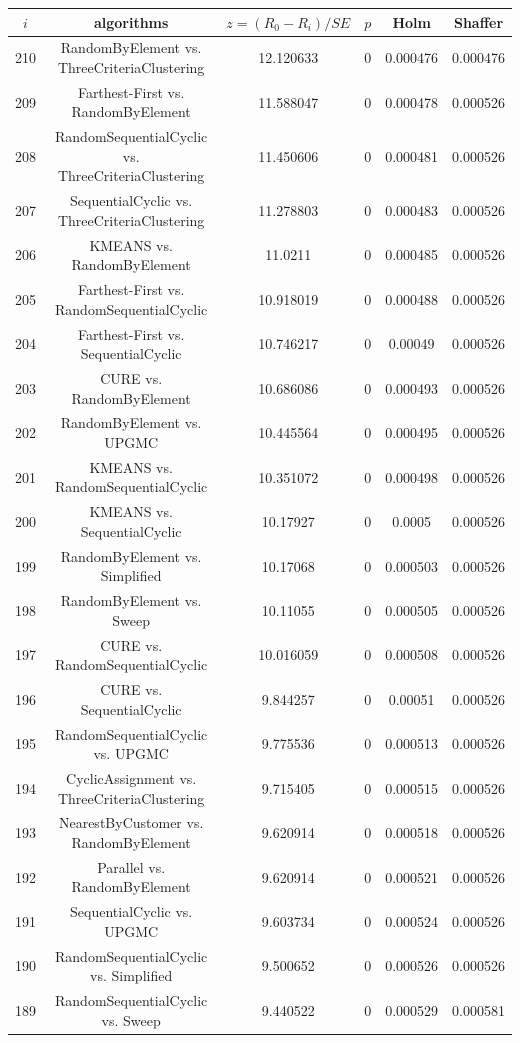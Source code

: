 \documentclass[a4paper,10pt]{article}
\begin{document}
\begin{landscape}
\begin{table}[!htp]
\centering\scriptsize
\begin{tabular}{cccccc}
$i$&algorithms&$z=(R_0 - R_i)/SE$&$p$&Holm&Shaffer\\
\hline210&RandomByElement vs. ThreeCriteriaClustering&12.120633&0&0.000476&0.000476\\
209&Farthest-First vs. RandomByElement&11.588047&0&0.000478&0.000526\\
208&RandomSequentialCyclic vs. ThreeCriteriaClustering&11.450606&0&0.000481&0.000526\\
207&SequentialCyclic vs. ThreeCriteriaClustering&11.278803&0&0.000483&0.000526\\
206&KMEANS vs. RandomByElement&11.0211&0&0.000485&0.000526\\
205&Farthest-First vs. RandomSequentialCyclic&10.918019&0&0.000488&0.000526\\
204&Farthest-First vs. SequentialCyclic&10.746217&0&0.00049&0.000526\\
203&CURE vs. RandomByElement&10.686086&0&0.000493&0.000526\\
202&RandomByElement vs. UPGMC&10.445564&0&0.000495&0.000526\\
201&KMEANS vs. RandomSequentialCyclic&10.351072&0&0.000498&0.000526\\
200&KMEANS vs. SequentialCyclic&10.17927&0&0.0005&0.000526\\
199&RandomByElement vs. Simplified&10.17068&0&0.000503&0.000526\\
198&RandomByElement vs. Sweep&10.11055&0&0.000505&0.000526\\
197&CURE vs. RandomSequentialCyclic&10.016059&0&0.000508&0.000526\\
196&CURE vs. SequentialCyclic&9.844257&0&0.00051&0.000526\\
195&RandomSequentialCyclic vs. UPGMC&9.775536&0&0.000513&0.000526\\
194&CyclicAssignment vs. ThreeCriteriaClustering&9.715405&0&0.000515&0.000526\\
193&NearestByCustomer vs. RandomByElement&9.620914&0&0.000518&0.000526\\
192&Parallel vs. RandomByElement&9.620914&0&0.000521&0.000526\\
191&SequentialCyclic vs. UPGMC&9.603734&0&0.000524&0.000526\\
190&RandomSequentialCyclic vs. Simplified&9.500652&0&0.000526&0.000526\\
189&RandomSequentialCyclic vs. Sweep&9.440522&0&0.000529&0.000581\\

\end{tabular}
\end{table}
\end{landscape}
\end{document}
